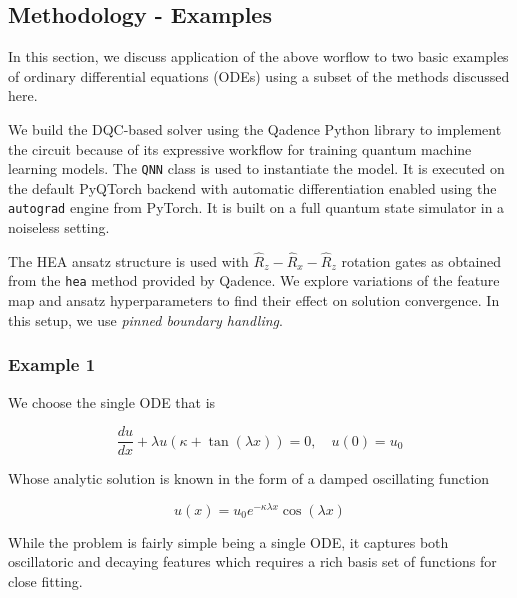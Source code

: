 \documentclass[11pt,a4paper]{article}
\begin{document}
{\subsection{Methodology - Examples}

In this section, we discuss application of the above worflow to two basic examples of ordinary differential equations (ODEs) using a subset of the methods discussed here.

We build the DQC-based solver using the Qadence Python library to implement the circuit because of its expressive workflow for training quantum machine learning models. The \texttt{QNN} class is used to instantiate the model. It is executed on the default PyQTorch backend with automatic differentiation enabled using the \texttt{autograd} engine from PyTorch. It is built on a full quantum state simulator in a noiseless setting.

The HEA ansatz structure is used with $\hat{R}_z-\hat{R}_x-\hat{R}_z$ rotation gates as obtained from the \texttt{hea} method provided by Qadence. We explore variations of the feature map and ansatz hyperparameters to find their effect on solution convergence. In this setup, we use \textit{pinned boundary handling}.

\subsubsection{Example 1}
We choose the single ODE that is

\begin{equation} \label{eq:first}
    \frac{du}{dx} + \lambda u (\kappa + \tan(\lambda x)) = 0, \quad u(0) = u_0
\end{equation}

Whose analytic solution is known in the form of a damped oscillating function

$$
u(x) = u_0 e^{-\kappa\lambda x} \cos(\lambda x)
$$

While the problem is fairly simple being a single ODE, it captures both oscillatoric and decaying features which requires a rich basis set of functions for close fitting.

}
\end{document}
